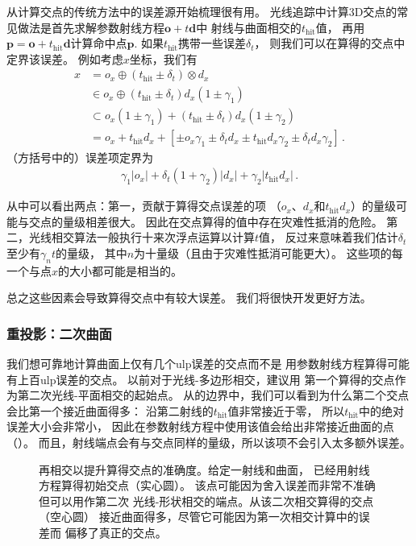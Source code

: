 从计算交点的传统方法中的误差源开始梳理很有用。
光线追踪中计算3D交点的常见做法是首先求解参数射线方程$\bm o+t\bm d$中
射线与曲面相交的$t_{\text{hit}}$值，
再用$\bm p=\bm o+t_{\text{hit}}\bm d$计算命中点$\bm p$.
如果$t_{\text{hit}}$携带一些误差$\delta_t$，
则我们可以在算得的交点中定界该误差。
例如考虑$x$坐标，我们有
\begin{align*}
    x & =o_x\oplus(t_{\text{hit}}\pm\delta_t)\otimes d_x                                                              \\
      & \in o_x\oplus(t_{\text{hit}}\pm\delta_t)d_x(1\pm\gamma_1)                                                     \\
      & \subset o_x(1\pm\gamma_1)+(t_{\text{hit}}\pm\delta_t)d_x(1\pm\gamma_2)                                        \\
      & =o_x+t_{\text{hit}}d_x+[\pm o_x\gamma_1\pm\delta_td_x\pm t_{\text{hit}}d_x\gamma_2\pm\delta_td_x\gamma_2]\, .
\end{align*}
（方括号中的）误差项定界为
\begin{align}\label{eq:3.13}
    \gamma_1|o_x|+\delta_t(1+\gamma_2)|d_x|+\gamma_2|t_{\text{hit}}d_x|\, .
\end{align}

从中可以看出两点：第一，贡献于算得交点误差的项
（$o_x$、$d_x$和$t_{\text{hit}}d_x$）的量级可能与交点的量级相差很大。
因此在交点算得的值中存在灾难性抵消的危险。
第二，光线相交算法一般执行十来次浮点运算以计算$t$值，
反过来意味着我们估计$\delta_t$至少有$\gamma_nt$的量级，
其中$n$为十量级（且由于灾难性抵消可能更大）。
这些项的每一个与点$x$的大小都可能是相当的。

总之这些因素会导致算得交点中有较大误差。
我们将很快开发更好方法。

\subsubsection*{重投影：二次曲面}
我们想可靠地计算曲面上仅有几个ulp误差的交点而不是
用参数射线方程算得可能有上百ulp误差的交点。
以前对于光线-多边形相交，\citet{536271}建议用
第一个算得的交点作为第二次光线-平面相交的起始点。
从的边界中，我们可以看到为什么第二个交点会比第一个接近曲面得多：
沿第二射线的$t_{\text{hit}}$值非常接近于零，
所以$t_{\text{hit}}$中的绝对误差大小会非常小，
因此在参数射线方程中使用该值会给出非常接近曲面的点（）。
而且，射线端点会有与交点同样的量级，所以该项不会引入太多额外误差。
\begin{figure}[htbp]
    \centering
    \caption{再相交以提升算得交点的准确度。给定一射线和曲面，
        已经用射线方程算得初始交点（实心圆）。
        该点可能因为舍入误差而非常不准确但可以用作第二次
        光线-形状相交的端点。从该二次相交算得的交点（空心圆）
        接近曲面得多，尽管它可能因为第一次相交计算中的误差而
        偏移了真正的交点。}
    \label{fig:3.44}
\end{figure}

